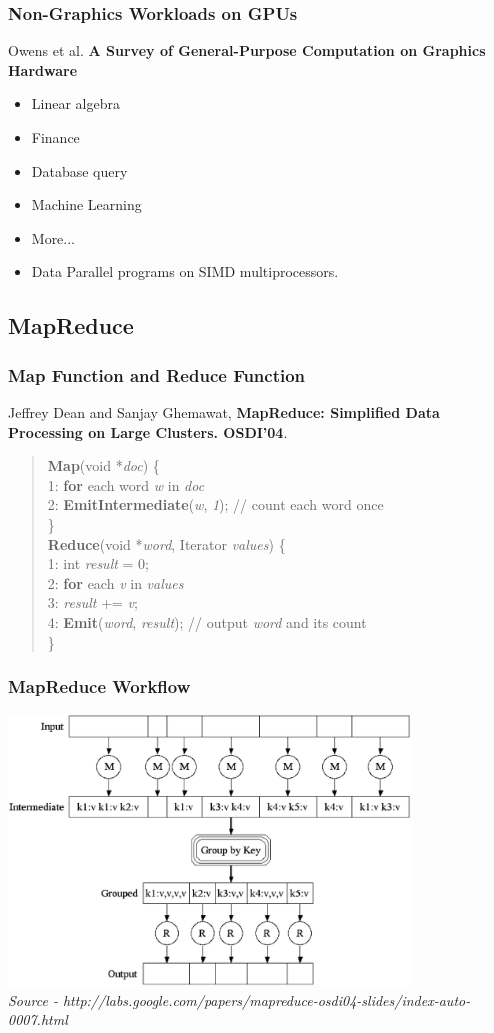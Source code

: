 \begin{frame}
\frametitle{Non-Graphics Workloads on GPUs}
Owens et al. \cite{Owens2007} \textbf{A Survey of General-Purpose Computation on Graphics Hardware}
\begin{itemize}
\item Linear algebra
\item Finance
\item Database query
\item Machine Learning
\item More...
\item \alert{Data Parallel} programs on SIMD multiprocessors.
\end{itemize}
\end{frame}

\subsection{MapReduce}
\begin{frame}
\frametitle{Map Function and Reduce Function}
Jeffrey Dean and Sanjay Ghemawat, \textbf{MapReduce: Simplified Data Processing on Large Clusters. OSDI'04}. \cite{Dean2008}
\begin{quote}
{\bf Map}(void *{\em doc}) \{ \\
1: {\bf for} each word {\em w} in {\em doc} \\
2: \hspace{3mm} {\bf EmitIntermediate}({\em w}, {\em 1}); // count each word once \\
\} \\
{\bf Reduce}(void *{\em word}, Iterator {\em values}) \{ \\
1: int {\em result} = 0; \\
2: {\bf for} each {\em v} in {\em values} \\
3: \hspace{3mm} {\em result} += {\em v}; \\
4: {\bf Emit}({\em word}, {\em result}); // output {\em word} and its count \\
\}
\end{quote}
\end{frame}

\begin{frame}
\frametitle{MapReduce Workflow}
\includegraphics[width=0.80\textwidth]{figure/mr_workflow.eps}
\\\tiny{{\em Source - http://labs.google.com/papers/mapreduce-osdi04-slides/index-auto-0007.html}}
\end{frame} 

